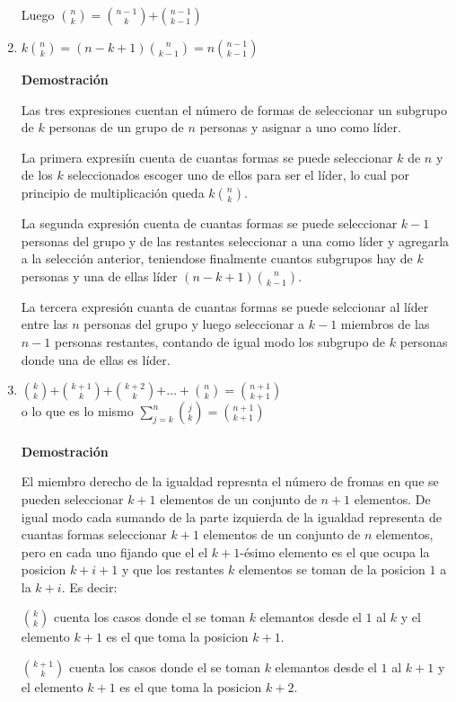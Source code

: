 \documentclass[a4paper,12pt]{report}
\begin{document}
\begin{enumerate}
 Luego ${n}\choose{k}$$=$${n-1}\choose{k}$$+$${n-1}\choose{k-1}$
 
 
 \item $k$${n}\choose{k}$$=(n-k+1)$${n}\choose{k-1}$$=n$${n-1}\choose{k-1}$
 
 \textbf{Demostración}
 
 Las tres expresiones cuentan el n\'umero de formas de seleccionar un subgrupo de $k$ personas de un grupo de $n$ personas y asignar a uno como l\'ider.

 La primera expresi\'in cuenta de cuantas formas se puede seleccionar $k$ de $n$ y de los $k$ seleccionados escoger uno de ellos para ser el l\'ider, lo cual por principio de multiplicaci\'on queda $k$${n}\choose{k}$. 
 
 La segunda expresi\'on cuenta de cuantas formas se puede seleccionar $k-1$ personas del grupo y de las restantes seleccionar a una como l\'ider y agregarla a la selecci\'on anterior, teniendose finalmente cuantos subgrupos hay de $k$ personas y una de ellas l\'ider $(n-k+1)$${n}\choose{k-1}$.

 La tercera expresi\'on cuanta de cuantas formas se puede selccionar al l\'ider entre las $n$ personas del grupo y luego seleccionar a $k-1$ miembros de las $n-1$ personas restantes, contando de igual modo los subgrupo de $k$ personas donde una de ellas es l\'ider.

 \item ${k}\choose{k}$$+$${k+1}\choose{k}$$+$${k+2}\choose{k}$$+\dots +$${n}\choose{k}$$=$${n+1}\choose{k+1}$\\ 
 o lo que es lo mismo $\sum^n_{j=k}$${j}\choose{k}$$=$${n+1}\choose{k+1}$\\\\
 
 \textbf{Demostración}

 El miembro derecho de la igualdad represnta el n\'umero de fromas en que se pueden seleccionar $k+1$ elementos de un conjunto de $n+1$ elementos. De igual modo 
 cada sumando de la parte izquierda de la igualdad representa de cuantas formas seleccionar $k+1$ elementos de un conjunto de $n$ elementos, pero en cada uno fijando que el el $k+1$-\'esimo elemento es el que ocupa la posicion $k+i +1$ y que los restantes $k$ elementos se toman de la posicion $1$ a la $k+i$. 
 Es decir:
 
 ${k}\choose{k}$ cuenta los casos donde el se toman $k$ elemantos desde el $1$ al $k$ y el elemento $k+1$ es el que toma la posicion $k+1$.

 ${k+1}\choose{k}$ cuenta los casos donde el se toman $k$ elemantos desde el $1$ al $k+1$ y el elemento $k+1$ es el que toma la posicion $k+2$.


\end{enumerate}
\end{document}

